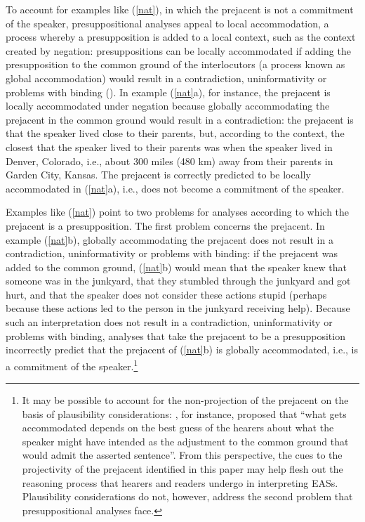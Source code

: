 \documentclass[11pt,fleqn]{article}
\newcommand{\6}{\mbox{$[\hspace*{-.6mm}[$}}
\newcommand{\9}{\mbox{$]\hspace*{-.6mm}]$}}
\begin{document}
To account for examples like (\ref{nat}), in which the prejacent is not a commitment of the speaker, presuppositional analyses appeal to local accommodation, a process whereby a presupposition is added to a local context, such as the context created by negation: presuppositions can be locally accommodated if adding the presupposition to the common ground of the interlocutors (a process known as global accommodation) would result in a contradiction, uninformativity or problems with
binding (\citealt{heim82,vds92}). In example (\ref{nat}a), for instance, the prejacent is locally accommodated under negation because globally accommodating the prejacent in the common ground would result in a contradiction: the prejacent is that the speaker lived close to their parents, but, according to the context, the closest that the speaker lived to their parents was when the speaker lived in Denver, Colorado, i.e., about 300 miles (480 km) away from their parents in Garden City, Kansas. The prejacent is correctly predicted to be locally accommodated in (\ref{nat}a), i.e., does not become a commitment of the speaker.

Examples like (\ref{nat}) point to two problems for analyses according to which the prejacent is a presupposition. The first problem concerns the prejacent. In example (\ref{nat}b), globally accommodating the prejacent does not result in a contradiction, uninformativity or problems with
binding: if the prejacent was added to the common ground,
(\ref{nat}b) would mean that the speaker knew that someone was in the
junkyard, that they stumbled through the junkyard and got hurt, and that
the speaker does not consider these actions stupid (perhaps because these actions
led to the person in the junkyard receiving help). Because such an interpretation does not result in a contradiction, uninformativity or problems with
binding, analyses that take the prejacent to be a presupposition incorrectly  predict that the prejacent of (\ref{nat}b) is globally accommodated, i.e., is a commitment of the speaker.\footnote{It may be possible to account for the non-projection of the prejacent on the basis of plausibility considerations: \citealt[162]{vonfintel08}, for instance,  proposed that ``what gets accommodated depends on the best guess of the hearers about what the speaker might have intended as the adjustment to the common ground that would admit the asserted sentence''. From this perspective, the cues to the projectivity of the prejacent identified in this paper may help flesh out the reasoning process that hearers and readers undergo in interpreting EASs. Plausibility considerations do not, however, address the second problem that presuppositional analyses face.}
\end{document}
